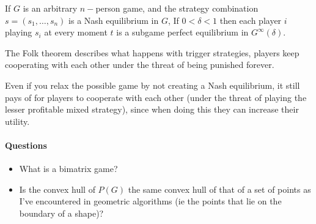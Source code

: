 \documentclass{article}
\begin{document}
If $G$ is an arbitrary $n-$person game, and the strategy combination
$s=(s_1,\dots,s_n)$ is a Nash equilibrium in $G$, If $0<\delta<1$ then each
player $i$ playing $s_i$ at every moment $t$ is a subgame perfect
equilibrium in $G^\infty(\delta)$.

The Folk theorem describes what happens with trigger strategies, players
keep cooperating with each other under the threat of being punished forever.

Even if you relax the possible game by not creating a Nash equilibrium, it
still pays of for players to cooperate with each other (under the threat
of playing the lesser profitable mixed strategy), since when doing
this they can increase their utility.
\paragraph{Questions}
\begin{itemize}
	\item What is a bimatrix game?
	\item Is the convex hull of $P(G)$ the same convex hull of that of a set of 
		points as I've encountered in geometric algorithms
		(ie the points that lie on the boundary of a shape)?
\end{itemize}
\end{document}
